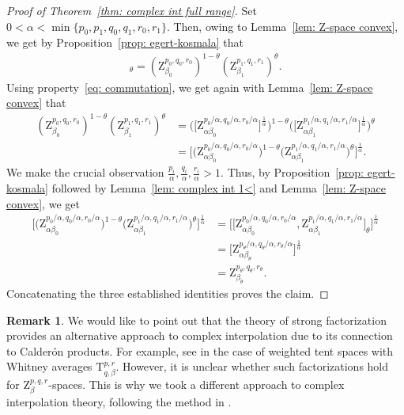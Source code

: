 \documentclass[11pt, leqno,parskip=half]{amsart}
\theoremstyle{definition}
\newtheorem{remark}[theorem]{Remark}
\renewcommand{\T}{\mathrm{T}}
\newcommand{\Z}{\mathrm{Z}}
\numberwithin{equation}{section}
\begin{document}
\begin{proof}[Proof of Theorem~\ref{thm: complex int full range}]
    Set $0<\alpha<\min\{p_0,p_1,q_0,q_1, r_0,r_1\}$. Then, owing to Lemma~\ref{lem: Z-space convex}, we get by Proposition~\ref{prop: egert-kosmala} that
    \begin{align*}
         [\Z^{p_0,q_0,r_0}_{\beta_0} , \Z^{p_1,q_1,r_1}_{\beta_1} ]_{\theta} = (\Z^{p_0,q_0,r_0}_{\beta_0} )^{1-\theta}   (\Z^{p_1,q_1,r_1}_{\beta_1} )^\theta.
    \end{align*}
    Using property~\eqref{eq: commutation}, we get again with Lemma~\ref{lem: Z-space convex} that
    \begin{align*}
        (\Z^{p_0,q_0,r_0}_{\beta_0} )^{1-\theta}  (\Z^{p_1,q_1,r_1}_{\beta_1} )^\theta &=  \Big( \big[\Z^{p_0/\alpha,q_0/\alpha,r_0/\alpha}_{\alpha\beta_0} \big]^{\frac{1}{\alpha}} \Big)^{1-\theta}   \Big(  \big[\Z^{p_1/\alpha,q_1/\alpha,r_1/\alpha}_{\alpha\beta_1} \big]^{\frac{1}{\alpha}} \Big)^{\theta} \\
        &=\Big[ \big(\Z^{p_0/\alpha,q_0/\alpha,r_0/\alpha}_{\alpha\beta_0}  \big)^{1-\theta}   \big(\Z^{p_1/\alpha,q_1/\alpha,r_1/\alpha}_{\alpha\beta_1} \big)^{\theta} \Big]^{\frac{1}{\alpha}}.
    \end{align*}
    We make the crucial observation $\tfrac{p_i}{\alpha}, \tfrac{q_i}{\alpha}, \tfrac{r_i}{\alpha}>1$. Thus, by Proposition~\ref{prop: egert-kosmala} followed by Lemma~\ref{lem: complex int 1<} and Lemma~\ref{lem: Z-space convex},
    we get
    \begin{align*}
        \Big[\big(\Z^{p_0/\alpha,q_0/\alpha,r_0/\alpha}_{\alpha\beta_0} \big)^{1-\theta}  \big(\Z^{p_1/\alpha,q_1/\alpha,r_1/\alpha}_{\alpha\beta_1}\big)^{\theta} \Big]^{\frac{1}{\alpha}}  &= \Big[\big[\Z^{p_0/\alpha,q_0/\alpha,r_0/\alpha}_{\alpha\beta_0} , \Z^{p_1/\alpha,q_1/\alpha,r_1/\alpha}_{\alpha\beta_1}\big]_\theta \Big]^{\frac{1}{\alpha}}\\
         &= \Big[ \Z^{p_\theta/\alpha,q_\theta/\alpha,r_\theta/\alpha}_{\alpha\beta_\theta}\Big]^{\frac{1}{\alpha}}\\
         &=  \Z^{p_\theta, q_\theta,r_\theta}_{\beta_\theta}.
    \end{align*}
    Concatenating the three established identities proves the claim.
\end{proof}


\begin{remark}
    We would like to point out that the theory of strong factorization provides an alternative approach to complex interpolation due to its connection to Calderón products. For example, see \cite{Huang} in the case of weighted tent spaces with Whitney averages $\T^{p,r}_{q,\beta}$. However, it is unclear whether such  factorizations hold for $\Z^{p,q,r}_\beta$-spaces. This is why we took a different approach to complex interpolation theory, following the method in \cite{Kalton_Mayboroda_Mitrea}.
\end{remark}
\end{document}
